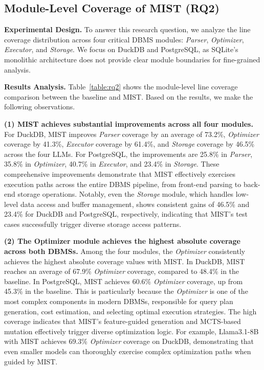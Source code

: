 \noindent
{}





\subsection{Module-Level Coverage of MIST (RQ2)}
\noindent \textbf{Experimental Design.} To answer this research question, we analyze the line coverage distribution across four critical DBMS modules: \textit{Parser}, \textit{Optimizer}, \textit{Executor}, and \textit{Storage}. We focus on DuckDB and PostgreSQL, as SQLite's monolithic architecture does not provide clear module boundaries for fine-grained analysis.

\noindent \textbf{Results Analysis.} Table~\ref{table:rq2} shows the module-level line coverage comparison between the baseline and MIST. Based on the results, we make the following observations.

\textbf{(1) MIST achieves substantial improvements across all four modules.} For DuckDB, MIST improves \textit{Parser} coverage by an average of 73.2\%, \textit{Optimizer} coverage by 41.3\%, \textit{Executor} coverage by 61.4\%, and \textit{Storage} coverage by 46.5\% across the four LLMs. For PostgreSQL, the improvements are 25.8\% in \textit{Parser}, 35.8\% in \textit{Optimizer}, 40.7\% in \textit{Executor}, and 23.4\% in \textit{Storage}. These comprehensive improvements demonstrate that MIST effectively exercises execution paths across the entire DBMS pipeline, from front-end parsing to back-end storage operations. Notably, even the \textit{Storage} module, which handles low-level data access and buffer management, shows consistent gains of 46.5\% and 23.4\% for DuckDB and PostgreSQL, respectively, indicating that MIST's test cases successfully trigger diverse storage access patterns.

\textbf{(2) The Optimizer module achieves the highest absolute coverage across both DBMSs.} Among the four modules, the \textit{Optimizer} consistently achieves the highest absolute coverage values with MIST. In DuckDB, MIST reaches an average of 67.9\% \textit{Optimizer} coverage, compared to 48.4\% in the baseline. In PostgreSQL, MIST achieves 60.6\% \textit{Optimizer} coverage, up from 45.3\% in the baseline. This is particularly because the \textit{Optimizer} is one of the most complex components in modern DBMSs, responsible for query plan generation, cost estimation, and selecting optimal execution strategies. The high coverage indicates that MIST's feature-guided generation and MCTS-based mutation effectively trigger diverse optimization logic. For example, Llama3.1-8B with MIST achieves 69.3\% \textit{Optimizer} coverage on DuckDB, demonstrating that even smaller models can thoroughly exercise complex optimization paths when guided by MIST.

